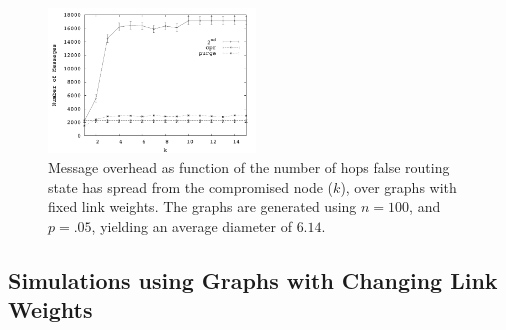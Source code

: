 \begin{figure}[t]
\centering
\includegraphics[width=0.49\textwidth]{figs/rollback-msg-rand5.pdf}
\caption{Message overhead as function of the number of hops false routing state has spread from the compromised node ($k$), over \er graphs with fixed link weights.  The \er
graphs are generated using $n=100$, and $p=.05$, yielding an average diameter of $6.14$.}
\label{fig:msg-rand-p05}
\end{figure}














\subsection{Simulations using Graphs with Changing Link Weights}
\label{subsec:simulation-lc}

